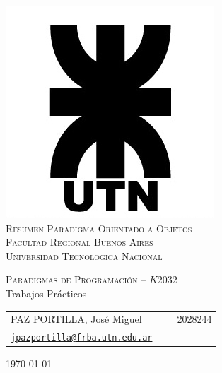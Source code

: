 \begin{titlepage}

\thispagestyle{empty}

\begin{center}
\includegraphics[scale=0.5]{./figuras/logo_utn}\\
\hfill \newline
\large{\textsc{Resumen Paradigma Orientado a Objetos}}\\
\large{\textsc{Facultad Regional Buenos Aires}}\\
\large{\textsc{Universidad Tecnologica Nacional}}\\
\end{center}

\begin{center}
\LARGE{\textsc{Paradigmas de Programación -- $K2032$}}\\
\hfill \newline
\huge{Trabajos Prácticos}
\end{center}

\vspace{2cm}



\begin{center}
	\begin{tabular}{lc}
		PAZ PORTILLA, José Miguel & \ \ \ 2028244 \\
		\texttt{\href{mailto:jpazportilla@frba.utn.edu.ar}{jpazportilla@frba.utn.edu.ar}}\\
	\end{tabular}
\end{center}

\vspace{1cm}
\begin{center}
\large{\today}
\end{center}

\end{titlepage}

%
%
{
  \hypersetup{linkcolor=black}
  \tableofcontents
}
\thispagestyle{empty}
\newpage
%
%
\setcounter{page}{1}
